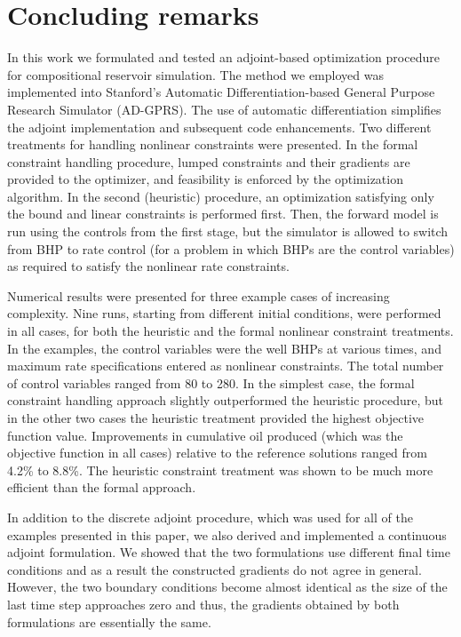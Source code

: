 \documentclass[twocolumn,numbook]{svjour3}          %
\begin{document}
\section{Concluding remarks}  \label{sec:conclusions}
In this work we formulated and tested an adjoint-based optimization procedure
for compositional reservoir simulation. The method we employed was implemented into
Stanford's Automatic Differentiation-based General Purpose Research Simulator
(AD-GPRS). The use of automatic differentiation simplifies the adjoint
implementation and subsequent code enhancements. Two different treatments for
handling nonlinear constraints were presented. In the formal constraint handling
procedure, lumped constraints and their gradients are provided to the optimizer,
and feasibility is enforced by the optimization algorithm. In the second
(heuristic) procedure, an optimization satisfying only the bound and linear
constraints is performed first. Then, the forward model is run using the
controls from the first stage, but the simulator is allowed to switch from BHP
to rate control (for a problem in which BHPs are the control variables) as
required to satisfy the nonlinear rate constraints.


Numerical results were presented for three example cases of increasing
complexity. Nine runs, starting from different initial conditions, were
performed in all cases, for both the heuristic and the formal nonlinear
constraint treatments. In the examples, the control variables were the well BHPs
at various times, and maximum rate specifications entered as nonlinear
constraints. The total number of control variables ranged from 80 to 280. In the
simplest case, the formal constraint handling approach slightly outperformed the
heuristic procedure, but in the other two cases the heuristic treatment provided
the highest objective function value. Improvements in cumulative oil produced
(which was the objective function in all cases) relative to the reference
solutions ranged from 4.2\% to 8.8\%.  The heuristic constraint treatment was
shown to be much more efficient than the formal approach. 

In addition to the discrete adjoint procedure, which was used for all of the
examples presented in this paper, we also derived and implemented a continuous
adjoint formulation. We showed that the two formulations use different
final time conditions and as a result the constructed gradients do not
agree in general. However, the two boundary conditions become almost identical as the
size of the last time step approaches zero and thus, the gradients obtained by
both formulations are essentially the same.
\end{document}
